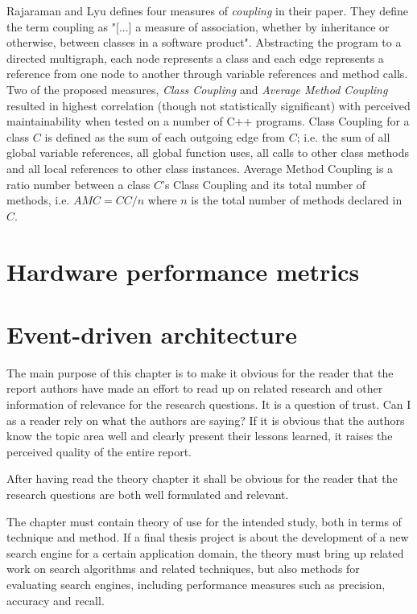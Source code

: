 Rajaraman and Lyu \cite{rajaraman1992reliability} defines four measures of
\textit{coupling} in their paper. They define the term coupling as "[...] a
measure of association, whether by inheritance or otherwise, between classes in
a software product". Abstracting the program to a directed multigraph, each
node represents a class and each edge represents a reference from one node to
another through variable references and method calls. Two of the proposed
measures, \textit{Class Coupling} and \textit{Average Method Coupling} resulted
in highest correlation (though not statistically significant) with perceived
maintainability when tested on a number of C++ programs. Class Coupling for a
class $C$ is defined as the sum of each outgoing edge from $C$; i.e. the sum of
all global variable references, all global function uses, all calls to other
class methods and all local references to other class instances. Average Method
Coupling is a ratio number between a class $C$'s Class Coupling and its total
number of methods, i.e. $AMC = CC / n$ where $n$ is the total number of methods
declared in $C$.

\section{Hardware performance metrics}

\section{Event-driven architecture}

\iffalse
The main purpose of this chapter is to make it obvious for
the reader that the report authors have made an effort to read
up on related research and other information of relevance for
the research questions. It is a question of trust. Can I as a
reader rely on what the authors are saying? If it is obvious
that the authors know the topic area well and clearly present
their lessons learned, it raises the perceived quality of the
entire report.

After having read the theory chapter it shall be obvious for
the reader that the research questions are both well
formulated and relevant.

The chapter must contain theory of use for the intended
study, both in terms of technique and method. If a final thesis
project is about the development of a new search engine for
a certain application domain, the theory must bring up related
work on search algorithms and related techniques, but also
methods for evaluating search engines, including
performance measures such as precision, accuracy and
recall.

